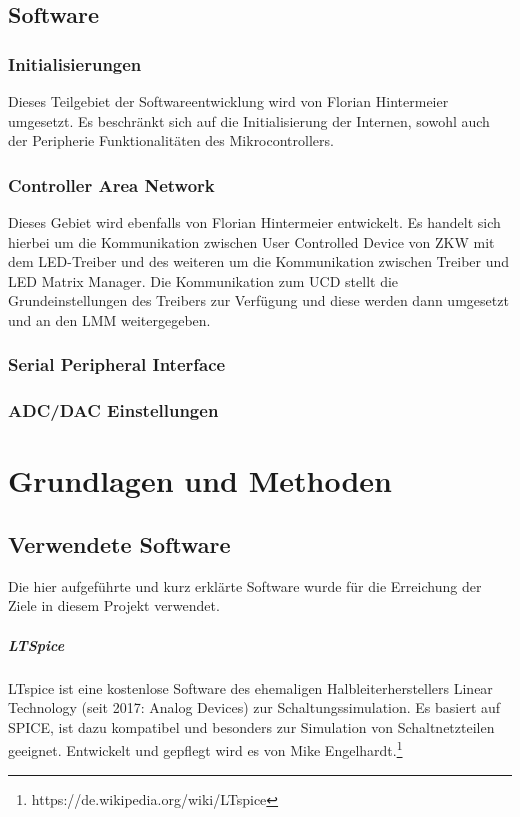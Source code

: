 \documentclass[paper=a4, 12pt]{scrreprt}
\begin{document}
    \section{Software}\hfill \break
    	\subsection{Initialisierungen}\hfill \break
    	Dieses Teilgebiet der Softwareentwicklung wird von Florian Hintermeier umgesetzt. Es beschränkt sich auf die Initialisierung der Internen, sowohl auch der Peripherie Funktionalitäten des Mikrocontrollers.\newpage
    	\subsection{Controller Area Network}\hfill \break
    	Dieses Gebiet wird ebenfalls von Florian Hintermeier entwickelt. Es handelt sich hierbei um die Kommunikation zwischen User Controlled Device von ZKW mit dem LED-Treiber und des weiteren um die Kommunikation zwischen Treiber und LED Matrix Manager.
    	Die Kommunikation zum UCD stellt die Grundeinstellungen des Treibers zur Verfügung und diese werden dann umgesetzt und an den LMM weitergegeben.
    	\subsection{Serial Peripheral Interface}\hfill \break
    	\subsection{ADC/DAC Einstellungen}\hfill \break

\chapter{Grundlagen und Methoden}\hfill \break
	\section{Verwendete Software}\hfill \break
	Die hier aufgeführte und kurz erklärte Software wurde für die Erreichung der Ziele in diesem Projekt verwendet.
	
	\paragraph{LTSpice}\hfill \break
	LTspice ist eine kostenlose Software des ehemaligen Halbleiterherstellers Linear Technology (seit 2017: Analog Devices) zur Schaltungssimulation. Es basiert auf SPICE, ist dazu kompatibel und besonders zur Simulation von Schaltnetzteilen geeignet. Entwickelt und gepflegt wird es von Mike Engelhardt.\footnote{https://de.wikipedia.org/wiki/LTspice}
\end{document}
